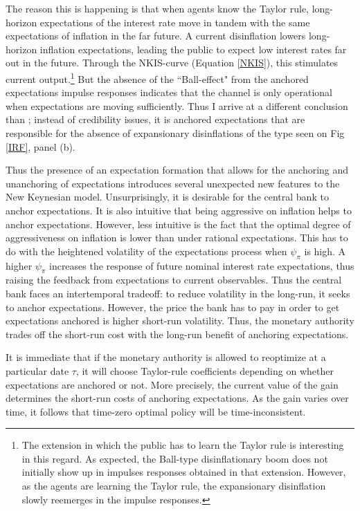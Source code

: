 \documentclass[11pt]{article}
\renewcommand{\[}{\begin{equation}}
\renewcommand{\]}{\end{equation}}
\begin{document}
The reason this is happening is that when agents know the Taylor rule, long-horizon expectations of the interest rate move in tandem with the same expectations of inflation in the far future. A current disinflation lowers long-horizon inflation expectations, leading the public to expect low interest rates far out in the future. Through the NKIS-curve (Equation \ref{NKIS}), this stimulates current output.\footnote{The extension in which the public has to learn the Taylor rule is interesting in this regard. As expected, the Ball-type disinflationary boom does not initially show up in impulses responses obtained in that extension. However, as the agents are learning the Taylor rule, the expansionary disinflation slowly reemerges in the impulse responses.} But the absence of the ``Ball-effect" from the anchored expectations impulse responses indicates that the channel is only operational when expectations are moving sufficiently. Thus I arrive at a different conclusion than \cite{ball1994credible}; instead of credibility issues, it is anchored expectations that are responsible for the absence of expansionary disinflations of the type seen on Fig \ref{IRF}, panel (b).

Thus the presence of an expectation formation that allows for the anchoring and unanchoring of expectations introduces several unexpected new features to the New Keynesian model. Unsurprisingly, it is desirable for the central bank to anchor expectations. It is also intuitive that being aggressive on inflation helps to anchor expectations. However, less intuitive is the fact that the optimal degree of aggressiveness on inflation is lower than under rational expectations. This has to do with the heightened volatility of the expectations process when $\psi_{\pi}$ is high. A higher $\psi_{\pi}$ increases the response of future nominal interest rate expectations, thus raising the feedback from expectations to current observables. Thus the central bank faces an intertemporal tradeoff: to reduce volatility in the long-run, it seeks to anchor expectations. However, the price the bank has to pay in order to get expectations anchored is higher short-run volatility. Thus, the monetary authority trades off the short-run cost with the long-run benefit of anchoring expectations.

It is immediate that if the monetary authority is allowed to reoptimize at a particular date $\tau$, it will choose Taylor-rule coefficients depending on whether expectations are anchored or not. More precisely, the current value of the gain determines the short-run costs of anchoring expectations. As the gain varies over time, it follows that time-zero optimal policy will be time-inconsistent. 
\end{document}
